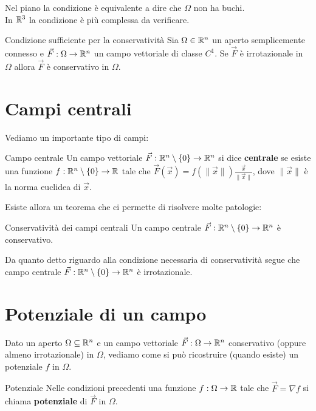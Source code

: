 Nel piano la condizione è equivalente a dire che $\Omega$ non ha buchi.\\
In $\mathbb{R}^3$ la condizione è più complessa da verificare.\\

\begin{teorema}{Condizione sufficiente per la conservatività}
  Sia $\Omega \in \mathbb{R}^n$ un aperto semplicemente connesso e $\vec F: \Omega \rightarrow \mathbb{R}^n$ un campo vettoriale di classe $C^1$. Se $\vec F$ è irrotazionale in $\Omega$ allora $\vec F$ è conservativo in $\Omega$.
\end{teorema}

\section{Campi centrali}
Vediamo un importante tipo di campi:

\begin{definizione}{Campo centrale}
  Un campo vettoriale $\vec F: \mathbb{R}^n \setminus \{0\} \rightarrow \mathbb{R}^n$ si dice \textbf{centrale} se esiste una funzione $f: \mathbb{R}^n \setminus \{0\} \rightarrow \mathbb{R}$ tale che $\vec F(\vec{x}) = f(\|\vec{x}\|) \frac{\vec{x}}{\|\vec{x}\|}$, dove $\|\vec{x}\|$ è la norma euclidea di $\vec{x}$.
\end{definizione}


Esiste allora un teorema che ci permette di risolvere molte patologie:
\begin{teorema}{Conservatività dei campi centrali}
  Un campo centrale $\vec F: \mathbb{R}^n \setminus \{0\} \rightarrow \mathbb{R}^n$ è conservativo.
\end{teorema}

\begin{osservazione}{}
  Da quanto detto riguardo alla condizione necessaria di conservatività segue che campo centrale $\vec F: \mathbb{R}^n \setminus \{0\} \rightarrow \mathbb{R}^n$ è irrotazionale.
\end{osservazione}

\section{Potenziale di un campo}

Dato un aperto $\Omega \subseteq \mathbb{R}^n$ e un campo vettoriale $\vec F: \Omega \rightarrow \mathbb{R}^n$ conservativo (oppure almeno irrotazionale) in $\Omega$, vediamo come si può ricostruire (quando esiste) un potenziale $f$ in $\Omega$.

\begin{definizione}{Potenziale}
  Nelle condizioni precedenti una funzione $f: \Omega \rightarrow \mathbb{R}$ tale che $\vec F = \nabla f$ si chiama \textbf{potenziale} di $\vec F$ in $\Omega$.
\end{definizione}


